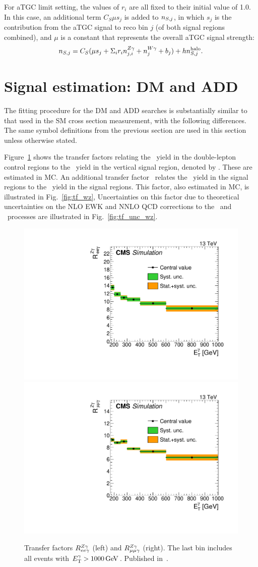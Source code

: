 For aTGC limit setting, the values of $r_{i}$ are all fixed to their initial value of 1.0.
In this case, an additional term $C_{S} \mu s_{j}$ is added to $\nS[,j]$,
in which $s_{j}$ is the contribution from the aTGC signal to reco bin $j$ (of both signal regions combined),
and $\mu$ is a constant that represents the overall aTGC signal strength:
\begin{equation}
  \nS[,j] = C_{S} (\mu s_{j} + \Sigma_{i}r_{i}\nZg[j,i] + \nWg[j] + b_{j}) + h\nhalo[,j].
\end{equation}

\section{Signal estimation: DM and ADD} \label{sec:signal_extraction_DM_ADD}
The fitting procedure for the DM and ADD searches is substantially similar to that used in the SM cross section measurement, with the following differences.
The same symbol definitions from the previous section are used in this section unless otherwise stated.

Figure~\ref{fig:tf_zll} shows the transfer factors relating the \zllg\ yield in the double-lepton control regions to the \zinvg\ yield in the
vertical signal region, denoted by \RZll[,j]. These are estimated in MC.
An additional transfer factor \fZW\ relates the \zinvg\ yield
in the signal regions to the \wlng\ yield in the signal regions. This factor, also estimated in MC, is illustrated in Fig.~\ref{fig:tf_wz},
Uncertainties on this factor due to theoretical uncertainties on the NLO EWK and NNLO QCD corrections to the \zinvg\ and \wlng\ processes are illustrated
in Fig.~\ref{fig:tf_unc_wz}.

\begin{figure}[htbp]
  \begin{center}
    \includegraphics[width=0.48\linewidth]{Figures/exo16053/Figure_002-a}
    \includegraphics[width=0.48\linewidth]{Figures/exo16053/Figure_002-b}
    \caption{
          Transfer factors $R^{\PZ\Pgamma}_{\Pe\Pe\Pgamma}$ (left) and $R^{\PZ\Pgamma}_{\Pmu\Pmu\Pgamma}$ (right). The last bin includes all events with $\ETgamma > 1000\unit{GeV}$.
          Published in~\cite{ref:JHEP02(2019)074}.
    }
    \label{fig:tf_zll}
  \end{center}
\end{figure}

